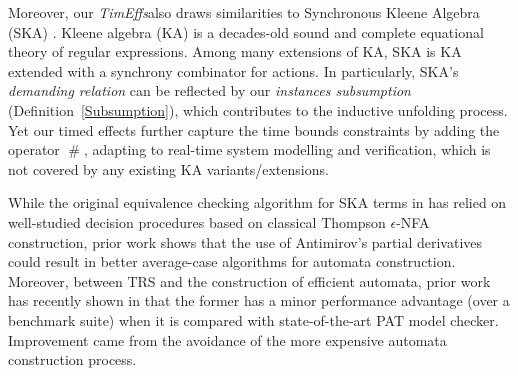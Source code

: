 \documentclass[acmsmall,10pt,review]{acmart}
\newcommand{\timedEffects}{\emph{TimEffs}}
\newcommand{\code}[1]{{\tt{\ensuremath{\m{#1}}}}}
\newcommand{\m}{\mathit}
\newcommand{\mysharp}{{\mathrel{\texttt{\#}}}}
\newcommand\defref[1]{Definition~\textcolor{blue}{\ref{#1}}}
\begin{document}
{%

Moreover, our \timedEffects also draws similarities to Synchronous Kleene Algebra (SKA) \cite{prisacariu2010synchronous}. 
Kleene algebra (KA) is a decades-old sound and complete equational theory of regular expressions. Among many extensions of KA,
  SKA is KA extended with a synchrony combinator for actions. In particularly, SKA's \emph{demanding relation} can be reflected by our \emph{instances subsumption} (\defref{Subsumption}), which contributes to the inductive unfolding process. 
Yet our timed effects further capture the time bounds constraints by adding the operator \code{\mysharp }, adapting to real-time system modelling and verification, which is not covered by any existing KA variants/extensions. 




While the original equivalence checking algorithm for SKA terms in \cite{prisacariu2010synchronous} has
relied on well-studied decision procedures based on classical Thompson \code{\epsilon}-NFA construction, prior work \cite{broda2015deciding}  shows that the use of Antimirov's partial derivatives
could result in better average-case algorithms for automata construction. 
Moreover, between TRS and the construction of efficient automata, prior work has recently shown in \cite{song2020automated} that the former has a minor performance advantage (over a benchmark suite) when it is compared with state-of-the-art PAT \cite{sun2009pat} model checker.
Improvement came from the avoidance of the more expensive automata construction process.



}
\end{document}
